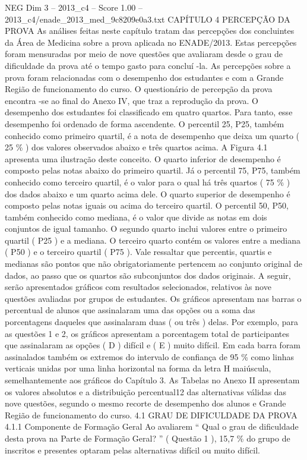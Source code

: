 \begin{textsample}{NEG Dim 3 – 2013\_c4 – Score 1.00 – 2013\_c4/enade\_2013\_med\_9c8209e0a3.txt}  \label{ex:f3_neg_136}
CAPÍTULO 4 PERCEPÇÃO DA PROVA As análises feitas neste capítulo tratam das percepções dos concluintes da Área de Medicina sobre a prova aplicada no ENADE/2013.
Estas percepções foram mensuradas por meio de nove questões que avaliaram desde o grau de dificuldade da prova até o tempo gasto para concluí -la.
As percepções sobre a prova foram relacionadas com o desempenho dos estudantes e com a Grande Região de funcionamento do curso.
O questionário de percepção da prova encontra -se ao final do Anexo IV, que traz a reprodução da prova.
O desempenho dos estudantes foi classificado em quatro quartos.
Para tanto, esse desempenho foi ordenado de forma ascendente.
O percentil 25, P25, também conhecido como primeiro quartil, é a nota de desempenho que deixa um quarto ( 25 \% ) dos valores observados abaixo e três quartos acima.
A Figura 4.1 apresenta uma ilustração deste conceito.
O quarto inferior de desempenho é composto pelas notas abaixo do primeiro quartil.
Já o percentil 75, P75, também conhecido como terceiro quartil, é o valor para o qual há três quartos ( 75 \% ) dos dados abaixo e um quarto acima dele.
O quarto superior de desempenho é composto pelas notas iguais ou acima do terceiro quartil.
O percentil 50, P50, também conhecido como mediana, é o valor que divide as notas em dois conjuntos de igual tamanho.
O segundo quarto inclui valores entre o primeiro quartil ( P25 ) e a mediana.
O terceiro quarto contém os valores entre a mediana ( P50 ) e o terceiro quartil ( P75 ).
Vale ressaltar que percentis, quartis e medianas são pontos que não obrigatoriamente pertencem ao conjunto original de dados, ao passo que os quartos são subconjuntos dos dados originais.
A seguir, serão apresentados gráficos com resultados selecionados, relativos às nove questões avaliadas por grupos de estudantes.
Os gráficos apresentam nas barras o percentual de alunos que assinalaram uma das opções ou a soma das porcentagens daqueles que assinalaram duas ( ou três ) delas.
Por exemplo, para as questões 1 e 2, os gráficos apresentam a porcentagem total de participantes que assinalaram as opções ( D ) difícil e ( E ) muito difícil.
Em cada barra foram assinalados também os extremos do intervalo de confiança de 95 \% como linhas verticais unidas por uma linha horizontal na forma da letra H maiúscula, semelhantemente aos gráficos do Capítulo 3.
As Tabelas no Anexo II apresentam os valores absolutos e a distribuição percentual12 das alternativas válidas das nove questões, segundo o mesmo recorte de desempenho dos alunos e Grande Região de funcionamento do curso. 4.1 GRAU DE DIFICULDADE DA PROVA 4.1.1 Componente de Formação Geral Ao avaliarem “ Qual o grau de dificuldade desta prova na Parte de Formação Geral? ” ( Questão 1 ), 15,7 \% do grupo de inscritos e presentes optaram pelas alternativas difícil ou muito difícil.

\end{textsample}
